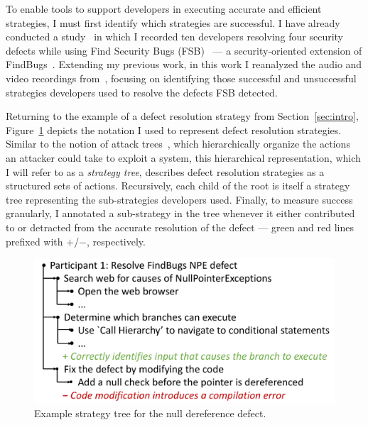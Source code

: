 \documentclass{sig-alternate}
\begin{document}
%
To enable tools to support developers in executing accurate and efficient strategies, I must first identify which strategies are successful. 
I have already conducted a study~\cite{Smith2015} in which I recorded ten developers resolving four security defects while using Find Security Bugs (FSB)~\cite{FindSecurityBugs} --- a security-oriented extension of FindBugs~\cite{FindBugs}.
Extending my previous work, in this work I reanalyzed the audio and video recordings from~\cite{Smith2015}, focusing on identifying those successful and unsuccessful strategies developers used to resolve the defects FSB detected.

Returning to the example of a defect resolution strategy from Section~\ref{sec:intro}, Figure~\ref{fig:description} depicts the notation I used to represent defect resolution strategies. 
Similar to the notion of attack trees~\cite{attackTrees}, which hierarchically organize the actions an attacker could take to exploit a system, this hierarchical representation, which I will refer to as a \textit{strategy tree}, describes defect resolution strategies as a structured sets of actions.
Recursively, each child of the root is itself a strategy tree representing the sub-strategies developers used.
Finally, to measure success granularly, I annotated a sub-strategy in the tree whenever it either contributed to or detracted from the accurate resolution of the defect --- green and red lines prefixed with $+$/$-$, respectively.


\begin{figure}
	\centering
	\includegraphics[width=\columnwidth]{"images/strategy description format"}
	\caption{Example strategy tree for the null dereference defect. }
	\label{fig:description} 

\end{figure}


\end{document}
